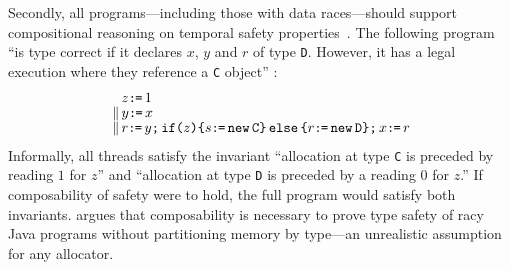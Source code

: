 Secondly, all programs---including those with data races---should support compositional reasoning on temporal safety properties~\cite{PnueliSafety,Misra:1981:PNP:1313338.1313770,StarkSafety,Abadi:1993:CS:151646.151649}.
The following program ``is type correct if it declares $x$, $y$ and $r$ of type \texttt{D}. However, it has a legal execution where they reference a \texttt{C} object'' \citep[Fig.~8]{DBLP:journals/toplas/Lochbihler13}:
\begin{gather}
  \label{lochbihler}
  \begin{aligned}
    &z \texttt{:}\mkern-1mu\texttt{=}\, 1
    \\[-1ex]
    \,\mathbin{\|}\,&
    y\texttt{:}\mkern-1mu\texttt{=}\, x
    \\[-1ex]
    \,\mathbin{\|}\,&
    r\texttt{:}\mkern-1mu\texttt{=}\, y \texttt{;}\,\allowbreak \texttt{if}\allowbreak\texttt{(}z\texttt{)} \allowbreak\texttt{\{} s \texttt{:}\mkern-1mu\texttt{=}\, \texttt{new}\, \texttt{C} \texttt{\}}\,\allowbreak\texttt{else}\allowbreak\,\texttt{\{} r \texttt{:}\mkern-1mu\texttt{=}\, \texttt{new}\, \texttt{D} \texttt{\}}  \texttt{;}\,\allowbreak x \texttt{:}\mkern-1mu\texttt{=}\, r 
  \end{aligned}
\end{gather}
 Informally, all threads satisfy the invariant ``allocation at type \texttt{C} is preceded by reading $1$ for $z$'' and ``allocation at type \texttt{D} is preceded by a reading $0$ for $z$.''  If composability of safety were to hold, the full program would satisfy both invariants.
\citeauthor{DBLP:journals/toplas/Lochbihler13} argues that composability is necessary to prove type safety of racy Java programs without partitioning memory by type---an unrealistic assumption for any allocator. %


